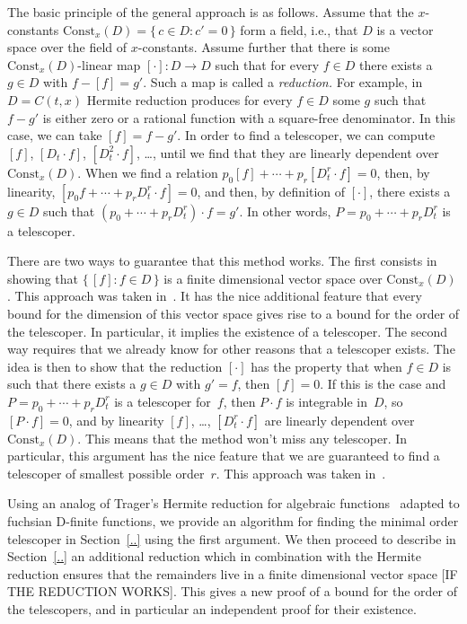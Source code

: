 \documentclass{sig-alternate}
\begin{document}
The basic principle of the general approach is as follows. Assume that the
$x$-constants $\mathrm{Const}_x(D)=\{\,c\in D:c'=0\,\}$ form a field, i.e., that $D$
is a vector space over the field of $x$-constants. Assume further that there is
some $\mathrm{Const}_x(D)$-linear map $[\cdot]\colon D\to D$ such that for every
$f\in D$ there exists a $g\in D$ with $f-[f]=g'$. Such a map is called a
\emph{reduction.} For example, in $D=C(t,x)$ Hermite reduction produces for
every $f\in D$ some $g$ such that $f-g'$ is either zero or a rational function
with a square-free denominator. In this case, we can take $[f]=f-g'$.
In order to find a telescoper, we can compute $[f]$, $[D_t\cdot f]$, $[D_t^2\cdot f]$, \dots,
until we find that they are linearly dependent over $\mathrm{Const}_x(D)$.
When we find a relation
$p_0[f] + \cdots + p_r[D_t^r\cdot f] = 0$,
then, by linearity,
$[p_0 f + \cdots + p_r D_t^r\cdot f] = 0$,
and then, by definition of $[\cdot]$, there exists a $g\in D$ such that $(p_0+\cdots + p_rD_t^r)\cdot f=g'$.
In other words, $P=p_0+\cdots + p_rD_t^r$ is a telescoper. 

There are two ways to guarantee that this method works. The first consists in
showing that $\{\,[f]:f\in D\,\}$ is a finite dimensional vector space over
$\mathrm{Const}_x(D)$. This approach was taken in~\cite{..,..,..}. It has the
nice additional feature that every bound for the dimension of this vector space
gives rise to a bound for the order of the telescoper. In particular, it implies
the existence of a telescoper. The second way requires that we already know for
other reasons that a telescoper exists. The idea is then to show that the
reduction $[\cdot]$ has the property that when $f\in D$ is such that there
exists a $g\in D$ with $g'=f$, then $[f]=0$. If this is the case and
$P=p_0+\cdots+p_rD_t^r$ is a telescoper for~$f$, then $P\cdot f$ is integrable
in~$D$, so $[P\cdot f]=0$, and by linearity $[f]$, \dots, $[D_t^r\cdot f]$ are
linearly dependent over $\mathrm{Const}_x(D)$. This means that the method won't
miss any telescoper. In particular, this argument has the nice feature that we
are guaranteed to find a telescoper of smallest possible order~$r$. This
approach was taken in~\cite{..}.

Using an analog of Trager's Hermite reduction for algebraic
functions~\cite{..,..}  adapted to fuchsian D-finite functions, we provide an
algorithm for finding the minimal order telescoper in Section~\ref{..} using the
first argument. We then proceed to describe in Section~\ref{..} an additional
reduction which in combination with the Hermite reduction ensures that the
remainders live in a finite dimensional vector space [IF THE REDUCTION
WORKS]. This gives a new proof of a bound for the order of the telescopers,
and in particular an independent proof for their existence.
\end{document}
